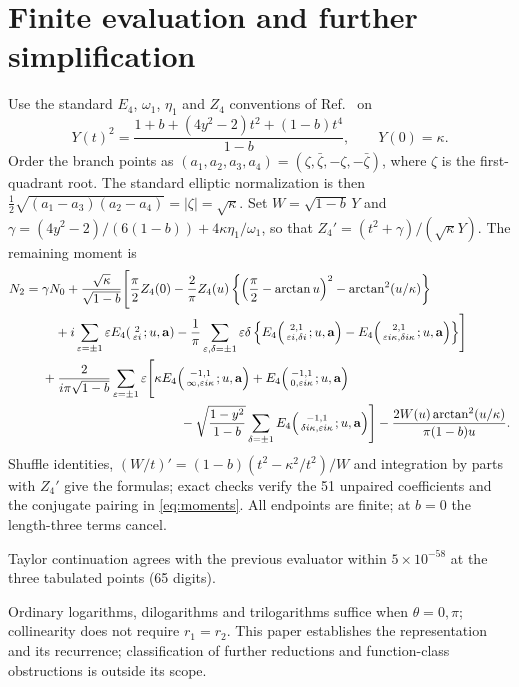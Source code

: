 \documentclass[10pt]{article}
\newcommand{\EF}[2]{E_4\!\left(\begin{smallmatrix}#1\\#2\end{smallmatrix};u,\mathbf a\right)}
\begin{document}
\appendix
\section{Finite evaluation and further simplification}\label{app:finite}
Use the standard $E_4$, $\omega_1$, $\eta_1$ and $Z_4$ conventions of Ref.~\cite{BDDT} on
\begin{equation}
 Y(t)^2=\frac{1+b+(4y^2-2)t^2+(1-b)t^4}{1-b},\qquad Y(0)=\kappa.
\end{equation}
Order the branch points as $(a_1,a_2,a_3,a_4)=(\zeta,\bar\zeta,-\zeta,-\bar\zeta)$, where $\zeta$ is the first-quadrant root.
The standard elliptic normalization is then $\tfrac12\sqrt{(a_1-a_3)(a_2-a_4)}=|\zeta|=\sqrt{\kappa}$.
Set $W=\sqrt{1-b}\,Y$ and $\gamma=(4y^2-2)/(6(1-b))+4\kappa\eta_1/\omega_1$, so that $Z_4'=(t^2+\gamma)/(\sqrt{\kappa}Y)$.
The remaining moment is
\begin{equation}\label{eq:N2E4}
\begin{aligned}
 N_2={}&\gamma N_0+\frac{\sqrt{\kappa}}{\sqrt{1-b}}\Biggl[\frac\pi2 Z_4(0)
 -\frac2\pi Z_4(u)\left\{\left(\frac\pi2-\arctan u\right)^2-\arctan^2(u/\kappa)\right\}\\
 &\quad+i\sum_{\varepsilon=\pm1}\varepsilon\EF{2}{\varepsilon i}
 -\frac1\pi\sum_{\varepsilon,\delta=\pm1}\varepsilon\delta
 \left\{\EF{2,1}{\varepsilon i,\delta i}-\EF{2,1}{\varepsilon i\kappa,\delta i\kappa}\right\}\Biggr]\\
 &+\frac{2}{i\pi\sqrt{1-b}}\sum_{\varepsilon=\pm1}\varepsilon
 \Biggl[\kappa\EF{-1,1}{\infty,\varepsilon i\kappa}+\EF{-1,1}{0,\varepsilon i\kappa}\\
 &\hspace{38mm}-\sqrt{\frac{1-y^2}{1-b}}\sum_{\delta=\pm1}\EF{-1,1}{\delta i\kappa,\varepsilon i\kappa}\Biggr]
 -\frac{2W(u)\arctan^2(u/\kappa)}{\pi(1-b)u}.
\end{aligned}
\end{equation}
Shuffle identities, $(W/t)'=(1-b)(t^2-\kappa^2/t^2)/W$ and integration by parts with $Z_4'$ give the formulas; exact checks verify the 51 unpaired coefficients and the conjugate pairing in \eqref{eq:moments}.
All endpoints are finite; at $b=0$ the length-three terms cancel.

Taylor continuation agrees with the previous evaluator within $5\times10^{-58}$ at the three tabulated points (65 digits).

Ordinary logarithms, dilogarithms and trilogarithms suffice when $\theta=0,\pi$; collinearity does not require $r_1=r_2$.
This paper establishes the representation and its recurrence; classification of further reductions and function-class obstructions is outside its scope.
\end{document}
